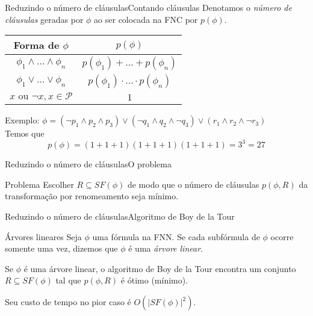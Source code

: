 \begin{frame}{Reduzindo o número de cláusulas}{Contando cláusulas}
	Denotamos o \emph{número de cláusulas} geradas por $\phi$ ao ser colocada na FNC por $p(\phi)$.
	\pause
	\begin{center}
	\begin{tabular}{c|c}
		Forma de $\phi$                   & $p(\phi)$                                 \\ \hline
		$\phi_1 \wedge ... \wedge \phi_n$ & $p(\phi_1) + ... + p(\phi_n)$                                  \\
		$\phi_1 \vee ... \vee \phi_n$     & $p(\phi_1) \cdot ... \cdot p(\phi_n)$                       \\
		$x \text{ ou } \neg x, x \in \mathcal{P}$            & $1$                                                             \\
	\end{tabular}
	\end{center}
	
	\pause Exemplo: $\phi = (\neg p_1 \wedge p_2 \wedge p_3) \vee (\neg q_1 \wedge q_2 \wedge \neg q_3) \vee (r_1 \wedge r_2 \wedge \neg r_3)$\\
	\pause Temos que $$p(\phi) = (1 + 1 + 1)(1 + 1 + 1)(1 + 1 + 1) = 3^3 = 27$$
\end{frame}

\begin{frame}{Reduzindo o número de cláusulas}{O problema}
	\begin{block}{Problema}
		Escolher $R \subseteq SF(\phi)$ de modo que o número de cláusulas $p(\phi,R)$ da transformação por renomeamento seja mínimo.
	\end{block}
\end{frame}

\begin{frame}{Reduzindo o número de cláusulas}{Algoritmo de Boy de la Tour}
	\begin{block}{Árvores lineares}
		Seja $\phi$ uma fórmula na FNN. Se cada subfórmula de $\phi$ ocorre somente uma vez, dizemos que $\phi$ é uma \emph{árvore linear}.
	\end{block}
	
	\pause Se $\phi$ é uma árvore linear, o algoritmo de Boy de la Tour encontra um conjunto $R \subseteq SF(\phi)$ tal que $p(\phi,R)$ é ótimo (mínimo).
	
	\vspace{.1cm}
	\pause Seu custo de tempo no pior caso é $O(|SF(\phi)|^2)$.
\end{frame}

